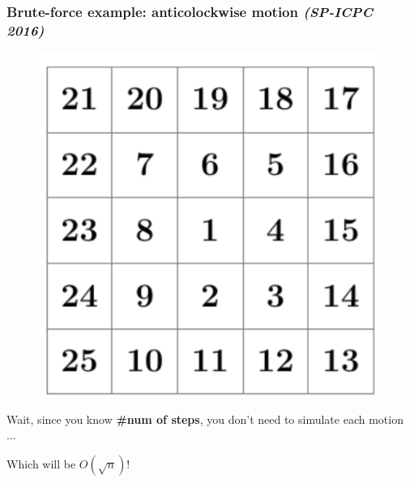 \documentclass{beamer}
\begin{document}
\begin{frame}
  \frametitle{Brute-force example: anticolockwise motion \textit{\small(SP-ICPC 2016)}}
\begin{minipage}{.4\textwidth}
\begin{figure}[]
  \includegraphics[width=1.0\textwidth]{pics/anticolockwise.png} 
\end{figure} 
\end{minipage}%
\begin{minipage}{.6\textwidth}
   {

    Wait, since you know \textbf{\#num of steps},
    you don't need to simulate each motion ...

     {

      Which will be $O(\sqrt{n})$!
    }
  }

\end{minipage}
\end{frame}
\end{document}
